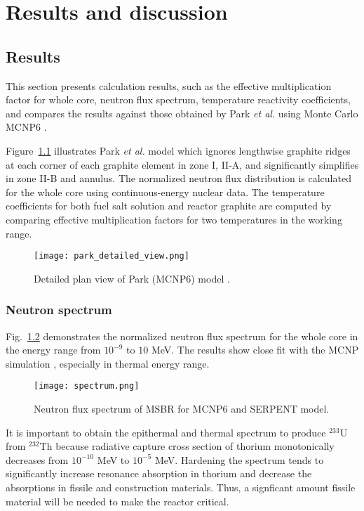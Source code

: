 \chapter[Results and discussion]{Results and discussion}

\section{Results}

This section presents calculation results, such as the effective multiplication 
factor for whole core, neutron flux spectrum, temperature reactivity 
coefficients, and compares the results against those obtained by Park \emph{et al.} using Monte Carlo \gls{MCNP}6 \cite{park_whole_2015}. 

Figure~\ref{fig:park_detailed_view} illustrates Park \emph{et al.} model which ignores lengthwise graphite ridges at each corner of each graphite element in zone I, II-A, and significantly simplifies in zone II-B and annulus. The normalized neutron flux distribution is calculated for the whole core using continuous-energy nuclear data. The temperature coefficients for both fuel salt solution and reactor graphite are computed by comparing effective multiplication factors for two temperatures in the working range.

\begin{figure}[htp!] %
  \centering
  \vspace{-0.3em}
  \texttt{[image: park\_detailed\_view.png]}
  \caption{Detailed plan view of Park (MCNP6) model \cite{park_whole_2015}.}
  \vspace{-0.6em}
  \label{fig:park_detailed_view}
\end{figure}
 	
\subsection{Neutron spectrum}
Fig.~\ref{fig:spectrum} demonstrates the normalized neutron flux spectrum for 
the whole core in the energy range from $10^{-9}$ to $10$ MeV. The results show 
close fit with the MCNP simulation \cite{park_whole_2015}, especially in 
thermal energy range.  
\begin{figure}[t!] %
  \centering
  \texttt{[image: spectrum.png]} \caption{Neutron flux 
  spectrum of \gls{MSBR} for MCNP6 and SERPENT model.}
  \label{fig:spectrum}
\end{figure}
It is important to obtain the epithermal and thermal spectrum to produce 
$^{233}$U from $^{232}$Th because radiative capture cross section of thorium 
monotonically decreases from $10^{-10}$ MeV to $10^{-5}$ MeV. Hardening the 
spectrum tends to significantly increase resonance absorption in thorium and 
decrease the absorptions in fissile and construction materials. Thus, a 
signficant amount fissile material will be needed to make the reactor critical.

